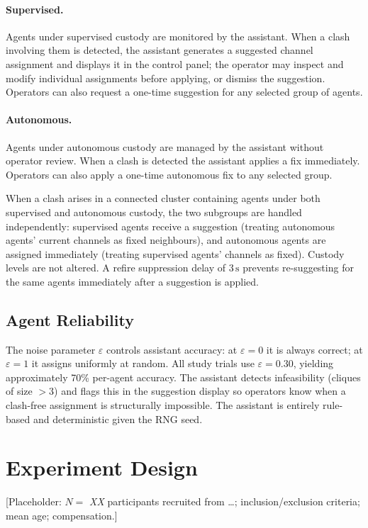 \documentclass[10pt]{article}
\theoremstyle{definition}
\begin{document}
\paragraph{Supervised.}
Agents under supervised custody are monitored by the assistant. When a clash involving them is detected, the assistant generates a suggested channel assignment and displays it in the control panel; the operator may inspect and modify individual assignments before applying, or dismiss the suggestion. Operators can also request a one-time suggestion for any selected group of agents.

\paragraph{Autonomous.}
Agents under autonomous custody are managed by the assistant without operator review. When a clash is detected the assistant applies a fix immediately. Operators can also apply a one-time autonomous fix to any selected group.

When a clash arises in a connected cluster containing agents under both supervised and autonomous custody, the two subgroups are handled independently: supervised agents receive a suggestion (treating autonomous agents' current channels as fixed neighbours), and autonomous agents are assigned immediately (treating supervised agents' channels as fixed). Custody levels are not altered. A refire suppression delay of $3\,\mathrm{s}$ prevents re-suggesting for the same agents immediately after a suggestion is applied.

\subsection{Agent Reliability}
The noise parameter $\varepsilon$ controls assistant accuracy: at $\varepsilon = 0$ it is always correct; at $\varepsilon = 1$ it assigns uniformly at random. All study trials use $\varepsilon = 0.30$, yielding approximately 70\% per-agent accuracy. The assistant detects infeasibility (cliques of size $> 3$) and flags this in the suggestion display so operators know when a clash-free assignment is structurally impossible. The assistant is entirely rule-based and deterministic given the RNG seed.

\section{Experiment Design}\label{sec:study}
[Placeholder: $N =$ \textit{XX} participants recruited from \ldots; inclusion/exclusion criteria; mean age; compensation.]
\end{document}
